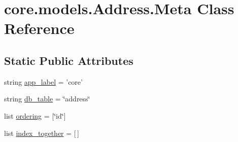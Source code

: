 \hypertarget{classcore_1_1models_1_1Address_1_1Meta}{\section{core.\-models.\-Address.\-Meta Class Reference}
\label{classcore_1_1models_1_1Address_1_1Meta}
}
\subsection*{Static Public Attributes}
\begin{DoxyCompactItemize}
\item 
string \hyperlink{classcore_1_1models_1_1Address_1_1Meta_a41c3b230056eb829cb99072a78407275}{app\-\_\-label} = 'core'
\item 
string \hyperlink{classcore_1_1models_1_1Address_1_1Meta_afb7542f2077d35eb48a61be943943a72}{db\-\_\-table} = \char`\"{}address\char`\"{}
\item 
list \hyperlink{classcore_1_1models_1_1Address_1_1Meta_aff66ed8857615a1bcdd7c791aec9eafd}{ordering} = \mbox{[}\char`\"{}id\char`\"{}\mbox{]}
\item 
list \hyperlink{classcore_1_1models_1_1Address_1_1Meta_af82184641195388b379e98b943300827}{index\-\_\-together} = \mbox{[}$\,$\mbox{]}
\end{DoxyCompactItemize}


